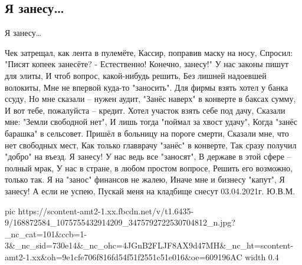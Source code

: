  
 
 
 
 

\subsection{Я занесу…}

Я занесу…

Чек затрещал, как лента в пулемёте,
Кассир, поправив маску на носу,
Спросил: "Писят копеек занесёте?
- Естественно! Конечно, занесу!"
У нас законы пишут для элиты,
И чтоб вопрос, какой-нибудь решить,
Без лишней надоевшей волокиты,
Мне не впервой куда-то "заносить".
Для фирмы взять хотел у банка ссуду,
Но мне сказали – нужен аудит,
"Занёс наверх" в конверте в баксах сумму,
И вот тебе, пожалуйста – кредит.
Хотел участок взять себе под дачу,
Сказали мне: "Земли свободной нет",
И лишь тогда "поймал за хвост удачу",
Когда "занёс барашка" в сельсовет.
Пришёл в больницу на пороге смерти,
Сказали мне, что нет свободных мест,
Как только главврачу "занёс" в конверте,
Так сразу получил "добро" на въезд.
Я занесу! У нас ведь все "заносят",
В державе в этой сфере – полный мрак,
У нас в стране, в любом простом вопросе,
Решить его возможно, только так.
Я на "занос" финансов не жалею,
Иначе мне и бизнесу "капут",
Я занесу! А если не успею,
Пускай меня на кладбище снесут
03.04.2021г. Ю.В.М.


\ifcmt
  pic https://scontent-amt2-1.xx.fbcdn.net/v/t1.6435-9/168872584_1075755432914209_3475792722530704812_n.jpg?_nc_cat=101&ccb=1-3&_nc_sid=730e14&_nc_ohc=4JGnB2FLJF8AX9d47MH&_nc_ht=scontent-amt2-1.xx&oh=9e1cfe706f816fd54f51f2551c51e016&oe=609196AC
  width 0.4
\fi

